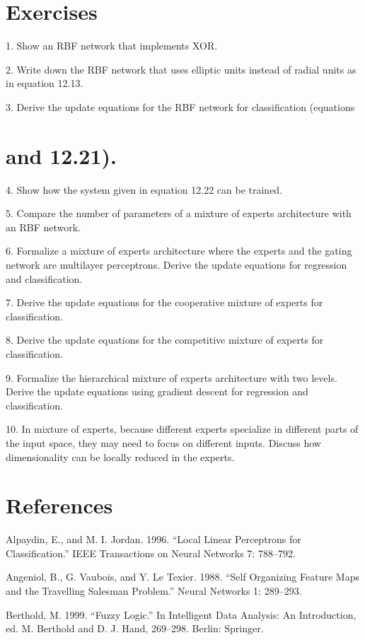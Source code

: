 \section{Exercises}

1. Show an RBF network that implements XOR.

2. Write down the RBF network that uses elliptic units instead of radial units as in equation 12.13.

3. Derive the update equations for the RBF network for classification (equations

\section{and 12.21).}

4. Show how the system given in equation 12.22 can be trained.

5. Compare the number of parameters of a mixture of experts architecture with an RBF network.

6. Formalize a mixture of experts architecture where the experts and the gating network are multilayer perceptrons. Derive the update equations for regression and classification.

7. Derive the update equations for the cooperative mixture of experts for classification.

8. Derive the update equations for the competitive mixture of experts for classification.

9. Formalize the hierarchical mixture of experts architecture with two levels. Derive the update equations using gradient descent for regression and classification.

10. In mixture of experts, because different experts specialize in different parts of the input space, they may need to focus on different inputs. Discuss how dimensionality can be locally reduced in the experts.

\section{References}

Alpaydin, E., and M. I. Jordan. 1996. “Local Linear Perceptrons for Classification.” IEEE Transactions on Neural Networks 7: 788--792.

Angeniol, B., G. Vaubois, and Y. Le Texier. 1988. “Self Organizing Feature Maps and the Travelling Salesman Problem.” Neural Networks 1: 289--293.

Berthold, M. 1999. “Fuzzy Logic.” In Intelligent Data Analysis: An Introduction, ed. M. Berthold and D. J. Hand, 269--298. Berlin: Springer.

